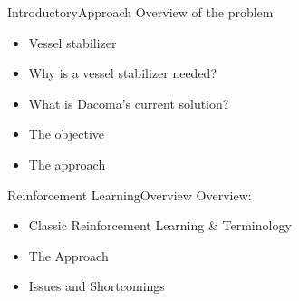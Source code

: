 \documentclass{beamer}
\begin{document}
\begin{frame}{Introductory}{Approach\vphantom{(y}}
\vspace{-0.7em}
Overview of the problem
\begin{itemize}
\item Vessel stabilizer
\item Why is a vessel stabilizer needed?
\item What is Dacoma's current solution?
\item The objective
\item {\color{blue}The approach}
\end{itemize}
\end{frame}


\begin{frame}{Reinforcement Learning}{Overview\vphantom{(y}}
\vspace{-0.7em}
Overview:
\begin{itemize}
\item Classic Reinforcement Learning \& Terminology
\item The Approach
\item Issues and Shortcomings
\end{itemize}
\end{frame}
\end{document}
